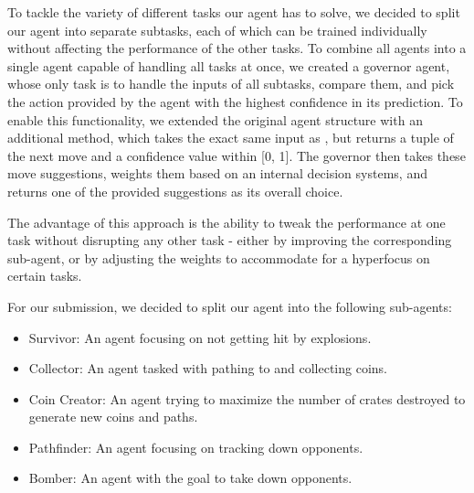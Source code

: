 To tackle the variety of different tasks our agent has to solve, we decided to split our agent into separate subtasks,
each of which can be trained individually without affecting the performance of the other tasks.
To combine all agents into a single agent capable of handling all tasks at once, we created a governor agent, whose only
task is to handle the inputs of all subtasks, compare them, and pick the action provided by the agent with the highest
confidence in its prediction.
To enable this functionality, we extended the original agent structure with an additional 
method, which takes the exact same input as , but returns a tuple of the next move and a confidence
value within [0, 1].
The governor then takes these move suggestions, weights them based on an internal decision systems, and returns one of
the provided suggestions as its overall choice.

The  advantage of this approach is the ability to tweak the performance at one task without disrupting any other task -
either by improving the corresponding sub-agent, or by adjusting the weights to accommodate for a hyperfocus on certain
tasks.

For our submission, we decided to split our agent into the following sub-agents:
\begin{itemize}
  \item Survivor: An agent focusing on not getting hit by explosions.
  \item Collector: An agent tasked with pathing to and collecting coins.
  \item Coin Creator: An agent trying to maximize the number of crates destroyed to generate new coins and paths.
  \item Pathfinder: An agent focusing on tracking down opponents.
  \item Bomber: An agent with the goal to take down opponents.
\end{itemize}

